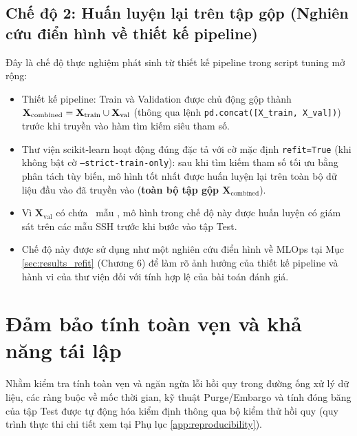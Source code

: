 \subsection{Chế độ 2: Huấn luyện lại trên tập gộp (Nghiên cứu điển hình về thiết kế pipeline)}
Đây là chế độ thực nghiệm phát sinh từ thiết kế pipeline trong script tuning mở rộng:
\begin{itemize}
    \item Thiết kế pipeline: Train và Validation được chủ động gộp thành $\mathbf{X}_{\text{combined}} = \mathbf{X}_{\text{train}} \cup \mathbf{X}_{\text{val}}$ (thông qua lệnh \texttt{pd.concat([X\_train, X\_val])}) trước khi truyền vào hàm tìm kiếm siêu tham số.
    \item Thư viện scikit-learn \cite{scikit_learn_refit} hoạt động đúng đặc tả với cờ mặc định \texttt{refit=True} (khi không bật cờ \texttt{--strict-train-only}): sau khi tìm kiếm tham số tối ưu bằng phân tách tùy biến, mô hình tốt nhất được huấn luyện lại trên toàn bộ dữ liệu đầu vào đã truyền vào (\textbf{toàn bộ tập gộp $\mathbf{X}_{\text{combined}}$}).
    \item Vì $\mathbf{X}_{\text{val}}$ có chứa \DataValidationSSH\ mẫu \SSH, mô hình trong chế độ này được huấn luyện có giám sát trên các mẫu SSH trước khi bước vào tập Test.
    \item Chế độ này được sử dụng như một nghiên cứu điển hình về MLOps tại Mục \ref{sec:results_refit} (Chương 6) để làm rõ ảnh hưởng của thiết kế pipeline và hành vi của thư viện đối với tính hợp lệ của bài toán đánh giá.
\end{itemize}

\section{Đảm bảo tính toàn vẹn và khả năng tái lập}
Nhằm kiểm tra tính toàn vẹn và ngăn ngừa lỗi hồi quy trong đường ống xử lý dữ liệu, các ràng buộc về mốc thời gian, kỹ thuật Purge/Embargo và tính đóng băng của tập Test được tự động hóa kiểm định thông qua bộ kiểm thử hồi quy  (quy trình thực thi chi tiết xem tại Phụ lục \ref{app:reproducibility}).
